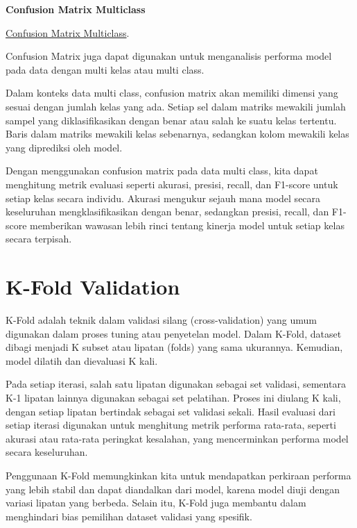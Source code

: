 \documentclass[
  letterpaper,
  DIV=11,
  numbers=noendperiod]{scrreprt}
\begin{document}
\textbf{Confusion Matrix Multiclass}

\href{https://www.analyticsvidhya.com/blog/2021/06/confusion-matrix-for-multi-class-classification/}{Confusion
Matrix Multiclass}.

Confusion Matrix juga dapat digunakan untuk menganalisis performa model
pada data dengan multi kelas atau multi class.

Dalam konteks data multi class, confusion matrix akan memiliki dimensi
yang sesuai dengan jumlah kelas yang ada. Setiap sel dalam matriks
mewakili jumlah sampel yang diklasifikasikan dengan benar atau salah ke
suatu kelas tertentu. Baris dalam matriks mewakili kelas sebenarnya,
sedangkan kolom mewakili kelas yang diprediksi oleh model.

Dengan menggunakan confusion matrix pada data multi class, kita dapat
menghitung metrik evaluasi seperti akurasi, presisi, recall, dan
F1-score untuk setiap kelas secara individu. Akurasi mengukur sejauh
mana model secara keseluruhan mengklasifikasikan dengan benar, sedangkan
presisi, recall, dan F1-score memberikan wawasan lebih rinci tentang
kinerja model untuk setiap kelas secara terpisah.

\hypertarget{k-fold-validation}{%
\section*{K-Fold Validation}\label{k-fold-validation}}


K-Fold adalah teknik dalam validasi silang (cross-validation) yang umum
digunakan dalam proses tuning atau penyetelan model. Dalam K-Fold,
dataset dibagi menjadi K subset atau lipatan (folds) yang sama
ukurannya. Kemudian, model dilatih dan dievaluasi K kali.

Pada setiap iterasi, salah satu lipatan digunakan sebagai set validasi,
sementara K-1 lipatan lainnya digunakan sebagai set pelatihan. Proses
ini diulang K kali, dengan setiap lipatan bertindak sebagai set validasi
sekali. Hasil evaluasi dari setiap iterasi digunakan untuk menghitung
metrik performa rata-rata, seperti akurasi atau rata-rata peringkat
kesalahan, yang mencerminkan performa model secara keseluruhan.

Penggunaan K-Fold memungkinkan kita untuk mendapatkan perkiraan performa
yang lebih stabil dan dapat diandalkan dari model, karena model diuji
dengan variasi lipatan yang berbeda. Selain itu, K-Fold juga membantu
dalam menghindari bias pemilihan dataset validasi yang spesifik.
\end{document}
